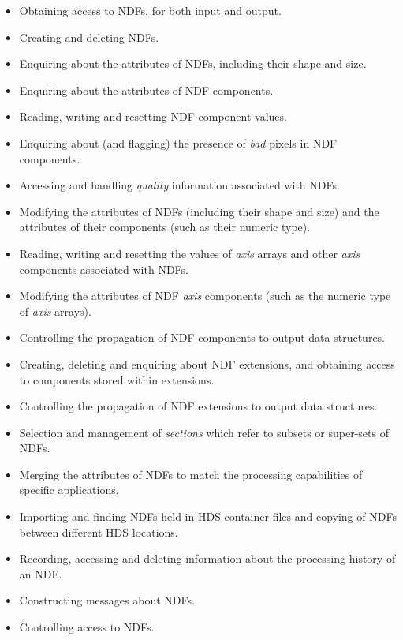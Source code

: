 \documentclass[twoside,11pt]{article}
\newcommand{\xref}[3]{#1}
\newcommand{\st}[1]{{\em{#1}}}
\begin{document}
\begin{itemize}
\item
Obtaining access to NDFs, for both input and output.

\item
Creating and deleting NDFs.

\item
Enquiring about the attributes of NDFs, including their shape and size.

\item
Enquiring about the attributes of NDF components. 

\item
Reading, writing and resetting NDF component values.

\item
Enquiring about (and flagging) the presence of \st{bad\/} pixels in NDF
components.

\item
Accessing and handling \st{quality\/} information associated with NDFs.

\item
Modifying the attributes of NDFs (including their shape and size) and the
attributes of their components (such as their numeric type). 

\item
Reading, writing and resetting the values of \st{axis\/} arrays and other
\st{axis\/} components associated with NDFs. 

\item
Modifying the attributes of NDF \st{axis} components (such as the numeric
type of \st{axis\/} arrays). 

\item
Controlling the propagation of NDF components to output data structures.

\item
Creating, deleting and enquiring about NDF extensions, and obtaining access
to components stored within extensions. 

\item
Controlling the propagation of NDF extensions to output data structures. 

\item
Selection and management of \st{sections\/} which refer to subsets or 
super-sets of NDFs.

\item
Merging the attributes of NDFs to match the processing capabilities of 
specific applications.

\item
Importing and finding NDFs held in \xref{HDS}{sun92}{} container files
and copying of NDFs between different HDS locations.

\item
Recording, accessing and deleting information about the processing
history of an NDF.

\item
Constructing messages about NDFs.

\item
Controlling access to NDFs.

\end{itemize}
\end{document}
